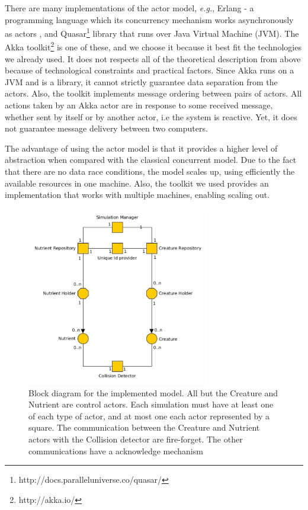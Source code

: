 \documentclass{aamas2017}
\begin{document}
There are many implementations of the actor model, \textit{e.g.}, Erlang - a programming language which its concurrency mechanism works  asynchronously as actors \cite{Armstrong2007}, and Quasar\footnote[1]{http://docs.paralleluniverse.co/quasar/} library that runs over Java Virtual Machine (JVM). The Akka toolkit\footnote[2]{http://akka.io/} is one of these, and we choose it because it best fit the technologies we already used. It does not respects all of the theoretical description from above because of technological constraints and practical factors. Since Akka runs on a JVM and is a library, it cannot strictly guarantee data separation from the actors. Also, the toolkit implements message ordering between pairs of actors. All actions taken by an Akka actor are in response to some received message, whether sent by itself or by another actor, i.e the system is reactive. Yet, it does not guarantee message delivery between two computers.

The advantage of using the actor model is that it provides a higher level of abstraction when compared with the classical concurrent model. Due to the fact that there are no data race conditions, the model scales up, using efficiently the available resources in one machine. Also, the toolkit we used provides an implementation that works with multiple machines, enabling scaling out.

\begin{figure}
	\centering
	\includegraphics[width=8cm]{images/diagramaAtores}
	\caption{Block diagram for the implemented model. All but the Creature and Nutrient are control actors. Each simulation must have at least one of each type of actor, and at most one each actor represented by a square. The communication between the Creature and Nutrient actors with the Collision detector are fire-forget. The other communications have a acknowledge mechanism}
	\label{diagramaAtores}
\end{figure}
\end{document}
